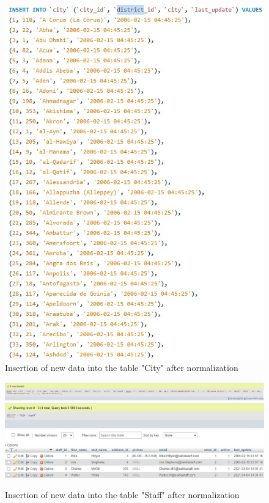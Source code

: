 \documentclass[openany]{article}
\begin{document}
		\begin{figure}[H]
			\includegraphics[width=\textwidth]{city1_insert_norm}
			\caption{Insertion of new data into the table "City" after normalization}
		\end{figure}
		\begin{figure}[H]
			\includegraphics[width=\textwidth]{staff1_insert_norm}
			\includegraphics[width=\textwidth]{staff2_insert_norm}
			\caption{Insertion of new data into the table "Staff" after normalization}
		\end{figure}
\end{document}
